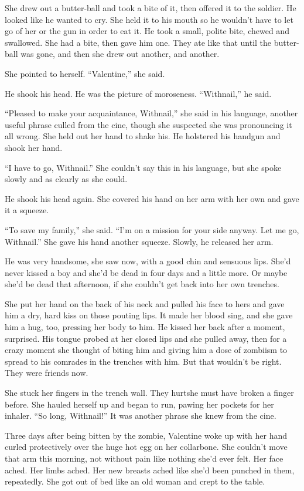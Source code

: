 She drew out a butter-ball and took a bite of it, then offered it
to the soldier. He looked like he wanted to cry. She held it to his
mouth so he wouldn’t have to let go of her or the gun in order to
eat it. He took a small, polite bite, chewed and swallowed. She had
a bite, then gave him one. They ate like that until the butter-ball
was gone, and then she drew out another, and another.

She pointed to herself. “Valentine,” she said.

He shook his head. He was the picture of moroseness. “Withnail,” he
said.

“Pleased to make your acquaintance, Withnail,” she said in his
language, another useful phrase culled from the cine, though she
suspected she was pronouncing it all wrong. She held out her hand
to shake his. He holstered his handgun and shook her hand.

“I have to go, Withnail.” She couldn’t say this in his language,
but she spoke slowly and as clearly as she could.

He shook his head again. She covered his hand on her arm with her
own and gave it a squeeze.

“To save my family,” she said. “I’m on a mission for your side
anyway. Let me go, Withnail.” She gave his hand another squeeze.
Slowly, he released her arm.

He was very handsome, she saw now, with a good chin and sensuous
lips. She’d never kissed a boy and she’d be dead in four days and a
little more. Or maybe she’d be dead that afternoon, if she couldn’t
get back into her own trenches.

She put her hand on the back of his neck and pulled his face to
hers and gave him a dry, hard kiss on those pouting lips. It made
her blood sing, and she gave him a hug, too, pressing her body to
him. He kissed her back after a moment, surprised. His tongue
probed at her closed lips and she pulled away, then for a crazy
moment she thought of biting him and giving him a dose of zombiism
to spread to his comrades in the trenches with him. But that
wouldn’t be right. They were friends now.

She stuck her fingers in the trench wall. They hurt\dash{}she must have
broken a finger before. She hauled herself up and began to run,
pawing her pockets for her inhaler. “So long, Withnail!” It was
another phrase she knew from the cine.

\tb

Three days after being bitten by the zombie, Valentine woke up with
her hand curled protectively over the huge hot egg on her
collarbone. She couldn’t move that arm this morning, not without
pain like nothing she’d ever felt. Her face ached. Her limbs ached.
Her new breasts ached like she’d been punched in them, repeatedly.
She got out of bed like an old woman and crept to the table.

